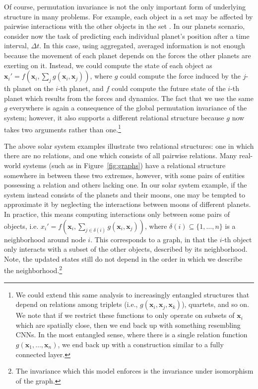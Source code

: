 Of course, permutation invariance is not the only important form of underlying structure in many problems.
For example, each object in a set may be affected by pairwise interactions with the other objects in the set \citep{hartford2018deep}.
In our planets scenario, consider now the task of predicting each individual planet's position after a time interval, $\Delta t$.
In this case, using aggregated, averaged information is not enough because the movement of each planet depends on the forces the other planets are exerting on it.
Instead, we could compute the state of each object as $\textbf{x}_i' = f(\textbf{x}_i, \sum_{j} g(\textbf{x}_i, \textbf{x}_j))$, where $g$ could compute the force induced by the $j$-th planet on the $i$-th planet, and $f$ could compute the future state of the $i$-th planet which results from the forces and dynamics.
The fact that we use the same $g$ everywhere is again a consequence of the global permutation invariance of the system; however, it also supports a different relational structure because $g$ now takes two arguments rather than one.\footnote{We could extend this same analysis to increasingly entangled structures that depend on relations among triplets (i.e., $g(\textbf{x}_i, \textbf{x}_j, \textbf{x}_k)$), quartets, and so on. We note that if we restrict these functions to only operate on subsets of $\mathbf{x}_i$ which are spatially close, then we end back up with something resembling CNNs. In the most entangled sense, where there is a single relation function $g(\textbf{x}_1, \ldots{}, \textbf{x}_n)$, we end back up with a construction similar to a fully connected layer.}

The above solar system examples illustrate two relational structures: one in which there are no relations, and one which consists of all pairwise relations.
Many real-world systems (such as in Figure~\ref{fig:graphs}) have a relational structure somewhere in between these two extremes, however, with some pairs of entities possessing a relation and others lacking one.
In our solar system example, if the system instead consists of the planets and their moons, one may be tempted to approximate it by neglecting the interactions between moons of different planets.
In practice, this means computing interactions only between some pairs of objects, i.e. $x_i' = f(\textbf{x}_i, \sum_{j \in \delta(i)} g(\textbf{x}_i, \textbf{x}_j))$, where $\delta(i) \subseteq \{1, \dots, n\}$ is a neighborhood around node $i$.
This corresponds to a graph, in that the $i$-th object only interacts with a subset of the other objects, described by its neighborhood.
Note, the updated states still do not depend in the order in which we describe the neighborhood.\footnote{The invariance which this model enforces is the invariance under isomorphism of the graph.}

